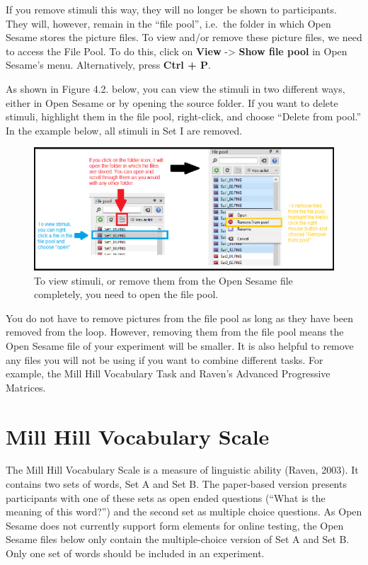 \documentclass[
]{book}
\begin{document}
If you remove stimuli this way, they will no longer be shown to participants. They will, however, remain in the ``file pool'', i.e.~the folder in which Open Sesame stores the picture files. To view and/or remove these picture files, we need to access the File Pool. To do this, click on \textbf{View} -\textgreater{} \textbf{Show file pool} in Open Sesame's menu. Alternatively, press \textbf{Ctrl + P}.

As shown in Figure 4.2. below, you can view the stimuli in two different ways, either in Open Sesame or by opening the source folder. If you want to delete stimuli, highlight them in the file pool, right-click, and choose ``Delete from pool.'' In the example below, all stimuli in Set I are removed.

\begin{figure}

{\centering \includegraphics[width=0.99\linewidth]{images/AdvancedRPMFilePool} 

}

\caption{To view stimuli, or remove them from the Open Sesame file completely, you need to open the file pool.}\label{fig:Figure1-2}
\end{figure}

You do not have to remove pictures from the file pool as long as they have been removed from the loop. However, removing them from the file pool means the Open Sesame file of your experiment will be smaller. It is also helpful to remove any files you will not be using if you want to combine different tasks. For example, the Mill Hill Vocabulary Task and Raven's Advanced Progressive Matrices.

\hypertarget{mill-hill-vocabulary-scale}{%
\section{Mill Hill Vocabulary Scale}\label{mill-hill-vocabulary-scale}}

The Mill Hill Vocabulary Scale is a measure of linguistic ability (Raven, 2003). It contains two sets of words, Set A and Set B. The paper-based version presents participants with one of these sets as open ended questions (``What is the meaning of this word?'') and the second set as multiple choice questions. As Open Sesame does not currently support form elements for online testing, the Open Sesame files below only contain the multiple-choice version of Set A and Set B. Only one set of words should be included in an experiment.
\end{document}
